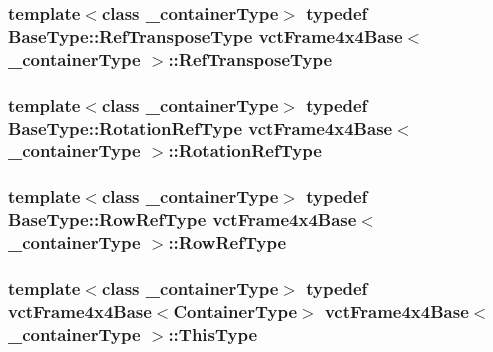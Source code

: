 \subsubsection[{Ref\+Transpose\+Type}]{\setlength{\rightskip}{0pt plus 5cm}template$<$class \+\_\+container\+Type$>$ typedef {\bf Base\+Type\+::\+Ref\+Transpose\+Type} {\bf vct\+Frame4x4\+Base}$<$ \+\_\+container\+Type $>$\+::{\bf Ref\+Transpose\+Type}}\label{classvct_frame4x4_base_aee8d584095f21f29903fe8a8b62fb9c6}
\hypertarget{classvct_frame4x4_base_a57cec1ba52b9787d77da60fb020c1999}{}
\subsubsection[{Rotation\+Ref\+Type}]{\setlength{\rightskip}{0pt plus 5cm}template$<$class \+\_\+container\+Type$>$ typedef Base\+Type\+::\+Rotation\+Ref\+Type {\bf vct\+Frame4x4\+Base}$<$ \+\_\+container\+Type $>$\+::{\bf Rotation\+Ref\+Type}}\label{classvct_frame4x4_base_a57cec1ba52b9787d77da60fb020c1999}
\hypertarget{classvct_frame4x4_base_a25703f0acac48328ee260245ddf4b2af}{}
\subsubsection[{Row\+Ref\+Type}]{\setlength{\rightskip}{0pt plus 5cm}template$<$class \+\_\+container\+Type$>$ typedef {\bf Base\+Type\+::\+Row\+Ref\+Type} {\bf vct\+Frame4x4\+Base}$<$ \+\_\+container\+Type $>$\+::{\bf Row\+Ref\+Type}}\label{classvct_frame4x4_base_a25703f0acac48328ee260245ddf4b2af}
\hypertarget{classvct_frame4x4_base_af6dcf167c0c3965872a095ce28853598}{}
\subsubsection[{This\+Type}]{\setlength{\rightskip}{0pt plus 5cm}template$<$class \+\_\+container\+Type$>$ typedef {\bf vct\+Frame4x4\+Base}$<${\bf Container\+Type}$>$ {\bf vct\+Frame4x4\+Base}$<$ \+\_\+container\+Type $>$\+::{\bf This\+Type}}\label{classvct_frame4x4_base_af6dcf167c0c3965872a095ce28853598}
\hypertarget{classvct_frame4x4_base_a0450063a4ebdf0f0c87c7f3fa789a17f}{}
